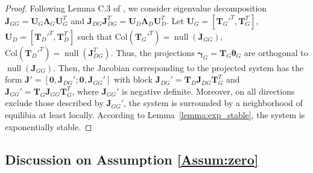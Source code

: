 \documentclass{article} %
\theoremstyle{plain}
\newtheorem*{proposition 1*}{Proposition 1}
\DeclareMathOperator{\nul}{null}
\begin{document}
\begin{appendices}
\begin{proof}
	Following Lemma C.3 of \cite{gan_stable}, we consider eigenvalue decomposition \(\bm{J}_{GG}=\bm{U}_G\bm{\Lambda}_G\bm{U}_G^T\) and \(\bm{J}_{DG}\bm{J}_{DG}^T=\bm{U}_D\bm{\Lambda}_D\bm{U}_D^T\). Let \(\bm{U}_G=[\bm{T}_G'^T, \bm{T}_G^T]\), \(\bm{U}_D=[\bm{T}_D'^T, \bm{T}_D^T]\) such that \(\text{Col}(\bm{T}_G'^T)=\nul(\bm{J}_{GG})\), \(\text{Col}(\bm{T}_D'^T)=\nul(\bm{J}_{DG}^T)\). Thus, the projections \(\bm{\gamma}_G=\bm{T}_G\bm{\theta}_G\) are orthogonal to \(\nul(\bm{J}_{GG})\). Then, the Jacobian corresponding to the projected system has the form \(\bm{J}'=[\bm{0}, \bm{J}_{DG}'; \bm{0}, \bm{J}_{GG}']\) with block \(\bm{J}_{DG}'=\bm{T}_D\bm{J}_{DG}\bm{T}_G^T\) and  \(\bm{J}_{GG}'=\bm{T}_G\bm{J}_{GG}\bm{T}_G^T\), where \(\bm{J}_{GG}'\) is negative definite. Moreover, on all directions exclude those described by \(\bm{J}_{GG}'\), the system is surrounded by a neighborhood of equilibia at least locally. According to Lemma~\ref{lemma:exp_stable}, the system is exponentially stable.
\end{proof}

\subsection{Discussion on Assumption \ref{Assum:zero}}
\label{Sec:discuss_assumption1}


\end{appendices}
\end{document}
